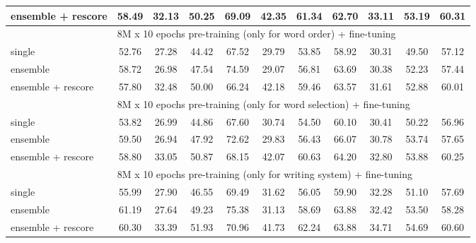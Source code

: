\documentclass[11pt]{article}
\begin{document}
\begin{multicols}{2}
\begin{table}[H]
\begin{tabular}{@{\extracolsep{2.5pt}}l ccc|ccc|ccc|c@{}}
			ensemble + rescore
			& 58.49 & 32.13 & 50.25 & 69.09 & 42.35 & 61.34 & 62.70 & 33.11 & 53.19 & 60.31 \\
			\hline
			& \multicolumn{10}{l}{8M x 10 epochs pre-training (only for word order) + fine-tuning} \\
			single
			& 52.76 & 27.28 & 44.42 & 67.52 & 29.79 & 53.85 & 58.92 & 30.31 & 49.50 & 57.12 \\
			ensemble
			& 58.72 & 26.98 & 47.54 & 74.59 & 29.07 & 56.81 & 63.69 & 30.38 & 52.23 & 57.44 \\
			ensemble + rescore
			& 57.80 & 32.48 & 50.00 & 66.24 & 42.18 & 59.46 & 63.57 & 31.61 & 52.88 & 60.01 \\
			\hline
			& \multicolumn{10}{l}{8M x 10 epochs pre-training (only for word selection) + fine-tuning} \\
			single
			& 53.82 & 26.99 & 44.86 & 67.60 & 30.74 & 54.50 & 60.10 & 30.41 & 50.22 & 56.96 \\
			ensemble
			& 59.50 & 26.94 & 47.92 & 72.62 & 29.83 & 56.43 & 66.07 & 30.78 & 53.74 & 57.65 \\
			ensemble + rescore
			& 58.80 & 33.05 & 50.87 & 68.15 & 42.07 & 60.63 & 64.20 & 32.80 & 53.88 & 60.25 \\
			\hline
			& \multicolumn{10}{l}{8M x 10 epochs pre-training (only for writing system) + fine-tuning} \\
			single
			& 55.99 & 27.90 & 46.55 & 69.49 & 31.62 & 56.05 & 59.90 & 32.28 & 51.10 & 57.69 \\
			ensemble
			& 61.19 & 27.64 & 49.23 & 75.38 & 31.13 & 58.69 & 63.88 & 32.42 & 53.50 & 58.28 \\
			ensemble + rescore
			& 60.30 & 33.39 & 51.93 & 70.96 & 41.73 & 62.24 & 63.88 & 34.71 & 54.69 & 60.60 \\
			\hline
		\end{tabular}
	\end{table}


\end{multicols}
\end{document}
